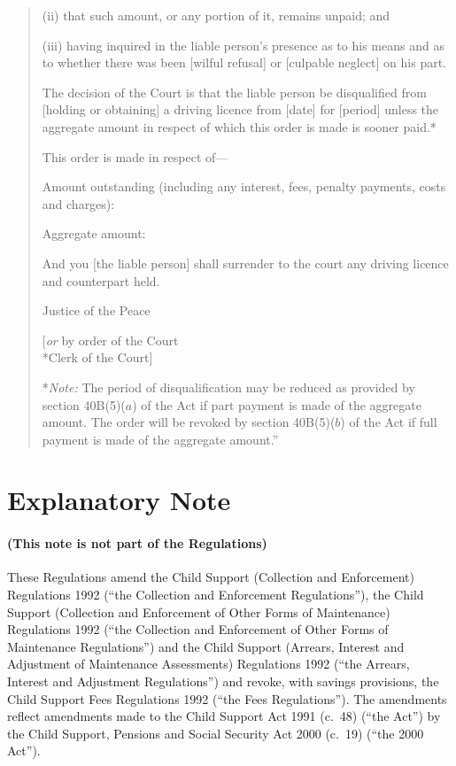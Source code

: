 \documentclass[12pt,a4paper]{article}
\begin{document}
\begin{quotation}
\begin{enumerate}
(ii) that such amount, or any portion of it, remains unpaid; and

(iii) having inquired in the liable person's presence as to his means and as to whether there was been [wilful refusal] or [culpable neglect] on his part.
\end{enumerate}

The decision of the Court is that the liable person be disqualified from [holding or obtaining] a driving licence from [date] for [period] unless the aggregate amount in respect of which this order is made is sooner paid.*

\medskip

This order is made in respect of---

Amount outstanding (including any interest, fees, penalty payments, costs and charges):

\medskip

Aggregate amount:

\medskip

And you [the liable person] shall surrender to the court any driving licence and counterpart held.

\medskip

{\raggedleft Justice of the Peace

\medskip

[\emph{or} by order of the Court\\*Clerk of the Court]

}

\medskip

*\emph{Note:} The period of disqualification may be reduced as provided by section 40B(5)($a$) of the Act if part payment is made of the aggregate amount.  The order will be revoked by section 40B(5)($b$) of the Act if full payment is made of the aggregate amount.''

\end{quotation}

\part{Explanatory Note}

\renewcommand\parthead{— Explanatory Note}

\subsection*{(This note is not part of the Regulations)}

These Regulations amend the Child Support (Collection and Enforcement) Regulations 1992 (“the Collection and Enforcement Regulations”), the Child Support (Collection and Enforcement of Other Forms of Maintenance) Regulations 1992 (“the Collection and Enforcement of Other Forms of Maintenance Regulations”) and the Child Support (Arrears, Interest and Adjustment of Maintenance Assessments) Regulations 1992 (“the Arrears, Interest and Adjustment Regulations”) and revoke, with savings provisions, the Child Support Fees Regulations 1992 (“the Fees Regulations”). The amendments reflect amendments made to the Child Support Act 1991 (c.\ 48) (“the Act”) by the Child Support, Pensions and Social Security Act 2000 (c.\ 19) (“the 2000 Act”).
\end{document}
